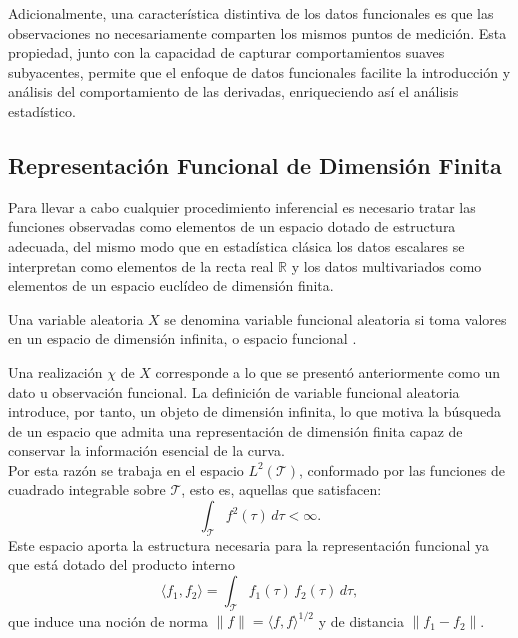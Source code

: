 Adicionalmente, una característica distintiva de los datos funcionales es que las observaciones no necesariamente comparten los mismos puntos de medición. Esta propiedad, junto con la capacidad de capturar comportamientos suaves subyacentes, permite que el enfoque de datos funcionales facilite la introducción y análisis del comportamiento de las derivadas, enriqueciendo así el análisis estadístico.

\subsection{Representación Funcional de Dimensión Finita}
\label{02_01_01_representacion_funcional}
Para llevar a cabo cualquier procedimiento inferencial es necesario tratar las funciones observadas como elementos de un espacio dotado de estructura adecuada, del mismo modo que en estadística clásica los datos escalares se interpretan como elementos de la recta real $\mathbb{R}$ y los datos multivariados como elementos de un espacio euclídeo de dimensión finita.

\begin{definition}
    Una variable aleatoria $X$ se denomina variable funcional aleatoria si toma valores en un espacio de dimensión infinita, o espacio funcional \citep{02_01_ferraty2006nonparametric}.
\end{definition}

Una realización $\chi$ de $X$ corresponde a lo que se presentó anteriormente como un dato u observación funcional. La definición de variable funcional aleatoria introduce, por tanto, un objeto de dimensión infinita, lo que motiva la búsqueda de un espacio que admita una representación de dimensión finita capaz de conservar la información esencial de la curva.\\

Por esta razón se trabaja en el espacio $L^2(\mathcal{T})$, conformado por las funciones de cuadrado integrable sobre $\mathcal{T}$, esto es, aquellas que satisfacen:
\begin{equation}
    \int_{\mathcal{T}} f^2(\tau)\,d\tau < \infty.
\end{equation}
Este espacio aporta la estructura necesaria para la representación funcional ya que está dotado del producto interno
\begin{equation}
    \langle f_1, f_2 \rangle = \int_{\mathcal{T}} f_1(\tau)\,f_2(\tau)\,d\tau,
\end{equation}
que induce una noción de norma $\|f\| = \langle f, f\rangle^{1/2}$ y de distancia $\|f_1 - f_2\|$.\\

